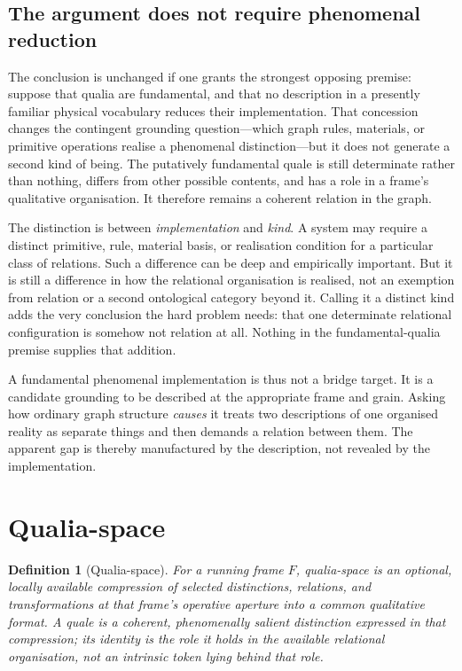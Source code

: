 \documentclass[11pt,a4paper]{article}
\newtheorem{definition}{Definition}[section]
\theoremstyle{remark}\newtheorem{remark}[definition]{Remark}
\begin{document}
\subsection{The argument does not require phenomenal reduction}\label{sec:nonreduction}

The conclusion is unchanged if one grants the strongest opposing premise: suppose
that qualia are fundamental, and that no description in a presently familiar
physical vocabulary reduces their implementation. That concession changes the
contingent grounding question---which graph rules, materials, or primitive
operations realise a phenomenal distinction---but it does not generate a second
kind of being. The putatively fundamental quale is still determinate rather than
nothing, differs from other possible contents, and has a role in a frame's
qualitative organisation. It therefore remains a coherent relation in the graph.

The distinction is between \emph{implementation} and \emph{kind}. A system may
require a distinct primitive, rule, material basis, or realisation condition for a
particular class of relations. Such a difference can be deep and empirically
important. But it is still a difference in how the relational organisation is
realised, not an exemption from relation or a second ontological category beyond
it. Calling it a distinct kind adds the very conclusion the hard problem needs:
that one determinate relational configuration is somehow not relation at all.
Nothing in the fundamental-qualia premise supplies that addition.

A fundamental phenomenal implementation is thus not a bridge target. It is a
candidate grounding to be described at the appropriate frame and grain. Asking how
ordinary graph structure \emph{causes} it treats two descriptions of one
organised reality as separate things and then demands a relation between them. The
apparent gap is thereby manufactured by the description, not revealed by the
implementation.

\section{Qualia-space}\label{sec:qualia-space}

\begin{definition}[Qualia-space]\label{def:qualia-space}
For a running frame $F$, \emph{qualia-space} is an optional, locally available
compression of selected distinctions, relations, and transformations at that
frame's operative aperture into a common qualitative format. A \emph{quale} is a
coherent, phenomenally salient distinction expressed in that compression; its
identity is the role it holds in the available relational organisation, not an
intrinsic token lying behind that role.
\end{definition}
\end{document}
